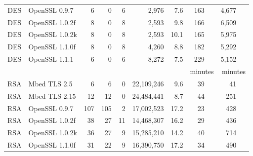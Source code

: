\begin{table}[h]
{\begin{tabular}{clrrrrrrr}
        DES                & OpenSSL 0.9.7            & 6                      & 0                   & 6                    & 2,976       & 7.6  & 163 ~~    & 4,677       ~~  \\
        DES                & OpenSSL 1.0.2f           & 8                      & 0                   & 8                    & 2,593       & 9.8  & 166 ~~    & 6,509       ~~  \\
        DES                & OpenSSL 1.0.2k           & 8                      & 0                   & 8                    & 2,593       & 10.1 & 165 ~~    & 5,975        ~~ \\
        DES                & OpenSSL 1.1.0f           & 8                      & 0                   & 8                    & 4,260       & 8.8  & 182 ~~    & 5,292        ~~ \\
        DES                & OpenSSL 1.1.1            & 6                      & 0                   & 6                    & 8,272       & 7.5  & 229 ~~    & 5,152       ~~  \\
                           &                          &                        &                     &                      &             &      & minutes   & minutes         \\\cline{8-9}
        RSA                & Mbed TLS 2.5             & 6                      & 6                   & 0                    & 22,109,246  & 9.6  & 39 ~~     & 41  ~~          \\
        RSA                & Mbed TLS 2.15            & 12                     & 12                  & 0                    & 24,484,441  & 8.7  & 44 ~~     & 251  ~~         \\
        RSA                & OpenSSL 0.9.7            & 107                    & 105                 & 2                    & 17,002,523  & 17.2 & 23 ~~     & 428 ~~          \\
        RSA                & OpenSSL 1.0.2f           & 38                     & 27                  & 11                   & 14,468,307  & 16.2 & 29 ~~     & 436  ~~         \\
        RSA                & OpenSSL 1.0.2k           & 36                     & 27                  & 9                    & 15,285,210  & 14.2 & 40 ~~     & 714   ~~        \\
        RSA                & OpenSSL 1.1.0f           & 31                     & 22                  & 9                    & 16,390,750  & 17.2 & 34 ~~     & 490 ~~          \\

\end{tabular}}
\end{table}
